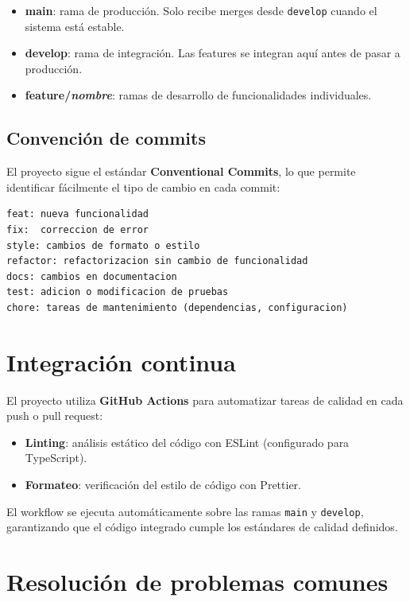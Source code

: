 \begin{itemize}
    \item \textbf{main}: rama de producción. Solo recibe merges desde \texttt{develop} cuando el sistema está estable.
    \item \textbf{develop}: rama de integración. Las features se integran aquí antes de pasar a producción.
    \item \textbf{feature/\textit{nombre}}: ramas de desarrollo de funcionalidades individuales.
\end{itemize}

\subsection{Convención de commits}

El proyecto sigue el estándar \textbf{Conventional Commits}, lo que permite identificar fácilmente el tipo de cambio en cada commit:

\begin{lstlisting}
feat: nueva funcionalidad
fix:  correccion de error
style: cambios de formato o estilo
refactor: refactorizacion sin cambio de funcionalidad
docs: cambios en documentacion
test: adicion o modificacion de pruebas
chore: tareas de mantenimiento (dependencias, configuracion)
\end{lstlisting}

\section{Integración continua}

El proyecto utiliza \textbf{GitHub Actions} para automatizar tareas de calidad en cada push o pull request:

\begin{itemize}
    \item \textbf{Linting}: análisis estático del código con ESLint (configurado para TypeScript).
    \item \textbf{Formateo}: verificación del estilo de código con Prettier.
\end{itemize}

El workflow se ejecuta automáticamente sobre las ramas \texttt{main} y \texttt{develop}, garantizando que el código integrado cumple los estándares de calidad definidos.

\section{Resolución de problemas comunes}

